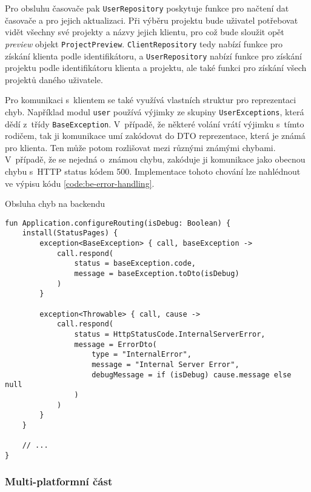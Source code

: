 Pro obsluhu časovače pak \texttt{UserRepository} poskytuje funkce pro načtení dat časovače a pro jejich aktualizaci. Při výběru projektu bude uživatel potřebovat vidět všechny své projekty a názvy jejich klientu, pro což bude sloužit opět \emph{preview} objekt \texttt{ProjectPreview}. \texttt{ClientRepository} tedy nabízí funkce pro získání klienta podle identifikátoru, a \texttt{UserRepository} nabízí funkce pro získání projektu podle identifikátoru klienta a projektu, ale také funkci pro získání všech projektů daného uživatele.

Pro komunikaci s~klientem se také využívá vlastních struktur pro reprezentaci chyb. Například modul \texttt{user} používá výjimky ze skupiny \texttt{UserExceptions}, která dědí z~třídy \texttt{BaseException}. V~případě, že některé volání vrátí výjimku s~tímto rodičem, tak ji komunikace umí zakódovat do DTO reprezentace, která je známá pro klienta. Ten může potom rozlišovat mezi různými známými chybami. V~případě, že se nejedná o~známou chybu, zakóduje ji komunikace jako obecnou chybu s~HTTP status kódem 500. Implementace tohoto chování lze nahlédnout ve výpisu kódu \ref{code:be-error-handling}.

\begin{listing}
\caption{Obsluha chyb na backendu}\label{code:be-error-handling}
\begin{verbatim}
fun Application.configureRouting(isDebug: Boolean) {
    install(StatusPages) {
        exception<BaseException> { call, baseException ->
            call.respond(
                status = baseException.code,
                message = baseException.toDto(isDebug)
            )
        }

        exception<Throwable> { call, cause ->
            call.respond(
                status = HttpStatusCode.InternalServerError,
                message = ErrorDto(
                    type = "InternalError",
                    message = "Internal Server Error",
                    debugMessage = if (isDebug) cause.message else null
                )
            )
        }
    }
    
    // ...
}
\end{verbatim}
\end{listing}

\subsubsection{Multi-platformní část}

